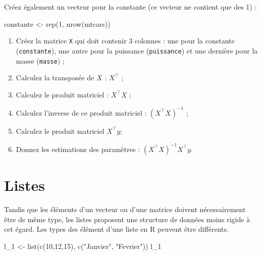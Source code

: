 \documentclass[
  11pt,
]{book}
\newenvironment{Shaded}{\begin{snugshade}}{\end{snugshade}}
\newcommand{\DecValTok}[1]{\textcolor[rgb]{0.00,0.00,0.81}{#1}}
\newcommand{\FunctionTok}[1]{\textcolor[rgb]{0.00,0.00,0.00}{#1}}
\newcommand{\NormalTok}[1]{#1}
\newcommand{\OtherTok}[1]{\textcolor[rgb]{0.56,0.35,0.01}{#1}}
\newcommand{\StringTok}[1]{\textcolor[rgb]{0.31,0.60,0.02}{#1}}
\providecommand{\tightlist}{%
  \setlength{\itemsep}{0pt}\setlength{\parskip}{0pt}}
\numberwithin{equation}{section}
\numberwithin{countremarque}{section}
\newenvironment{greenbox}{
  \begin{tcolorbox}[breakable, colback=vert,coltext=black,
                  colframe=grisfonce]}
 {\end{tcolorbox}}
\begin{document}
\begin{greenbox}
Créez également un vecteur pour la constante (ce vecteur ne contient que des 1) :

\begin{Shaded}
\begin{Highlighting}[]
\NormalTok{constante }\OtherTok{\textless{}{-}} \FunctionTok{rep}\NormalTok{(}\DecValTok{1}\NormalTok{, }\FunctionTok{nrow}\NormalTok{(mtcars))}
\end{Highlighting}
\end{Shaded}

\begin{enumerate}
\def\labelenumi{\arabic{enumi}.}
\tightlist
\item
  Créez la matrice \texttt{X} qui doit contenir 3 colonnes : une pour la constante (\texttt{constante}), une autre pour la puissance (\texttt{puissance}) et une dernière pour la masse (\texttt{masse}) ;
\item
  Calculez la transposée de \(X\) : \(X^\top\) ;
\item
  Calculez le produit matriciel : \(X^\top X\) ;
\item
  Calculez l'inverse de ce produit matriciel : \((X^\top X)^{-1}\) ;
\item
  Calculez le produit matriciel \(X^\top y\);
\item
  Donnez les estimations des paramètres : \((X^\top X)^{-1} X^\top y\).
\end{enumerate}

\end{greenbox}

\hypertarget{listes}{%
\section{Listes}\label{listes}}

Tandis que les éléments d'un vecteur ou d'une matrice doivent nécessairement être de même type, les listes proposent une structure de données moins rigide à cet égard. Les types des élément d'une liste en R peuvent être différents.

\begin{Shaded}
\begin{Highlighting}[]
\NormalTok{l\_1 }\OtherTok{\textless{}{-}} \FunctionTok{list}\NormalTok{(}\FunctionTok{c}\NormalTok{(}\DecValTok{10}\NormalTok{,}\DecValTok{12}\NormalTok{,}\DecValTok{15}\NormalTok{), }\FunctionTok{c}\NormalTok{(}\StringTok{"Janvier"}\NormalTok{, }\StringTok{"Fevrier"}\NormalTok{))}
\NormalTok{l\_1}
\end{Highlighting}
\end{Shaded}
\end{document}
